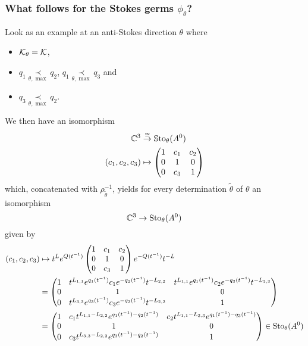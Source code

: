 \subsubsection{What follows for the Stokes germs $\phi_\theta$?}
Look as an example at an anti-Stokes direction $\theta$ where
\begin{itemize}
  \item $\mathcal{K}_{\theta}=\mathcal{K}$,
  \item $q_1 \underset{\theta,\max}{\prec} q_2$,
    $q_1 \underset{\theta,\max}{\prec} q_3$ and
  \item $q_3 \underset{\theta,\max}{\prec} q_2$.
\end{itemize}
We then have an isomorphism
\begin{align*}
  \mathbb{C}^3 &\overset\cong\to \operatorname{\mathbb{S}to}_\theta(A^0)
\\(c_1,c_2,c_3) &\mapsto
  \begin{pmatrix}
    1     & c_1 & c_2
  \\0     & 1     & 0
  \\0     & c_3 & 1
  \end{pmatrix}
\end{align*}
which, concatenated with $\rho_{\tilde\theta}^{-1}$, yields for every
determination $\tilde\theta$ of $\theta$ an isomorphism
\[
  \mathbb{C}^3\to\operatorname{Sto}_\theta(A^0)
\]
given by
\begin{align*}
  (c_1,c_2,c_3) &\mapsto
  t^{L}e^{Q(t^{-1})}
  \begin{pmatrix}
    1     & c_1 & c_2
  \\0     & 1     & 0
  \\0     & c_3 & 1
  \end{pmatrix}
  e^{-Q(t^{-1})}t^{-L}
\\&=
  \begin{pmatrix}
    1
    & t^{L_{1,1}}e^{q_1(t^{-1})}c_1 e^{-q_2(t^{-1})}t^{-L_{2,2}}
    & t^{L_{1,1}}e^{q_1(t^{-1})}c_2 e^{-q_3(t^{-1})}t^{-L_{3,3}}
    \\0     & 1     & 0
    \\0
    & t^{L_{3,3}}e^{q_3(t^{-1})}c_3 e^{-q_2(t^{-1})}t^{-L_{2,2}}
    & 1
  \end{pmatrix}
\\&=
  \begin{pmatrix}
    1
    & c_1 t^{L_{1,1}-L_{2,2}}e^{q_1(t^{-1})-q_2(t^{-1})}
    & c_2 t^{L_{1,1}-L_{3,3}}e^{q_1(t^{-1})-q_3(t^{-1})}
    \\0     & 1     & 0
    \\0
    & c_3 t^{L_{3,3}-L_{2,2}}e^{q_3(t^{-1})-q_2(t^{-1})}
    & 1
  \end{pmatrix}
  \in\operatorname{Sto}_\theta(A^0)
\end{align*}

